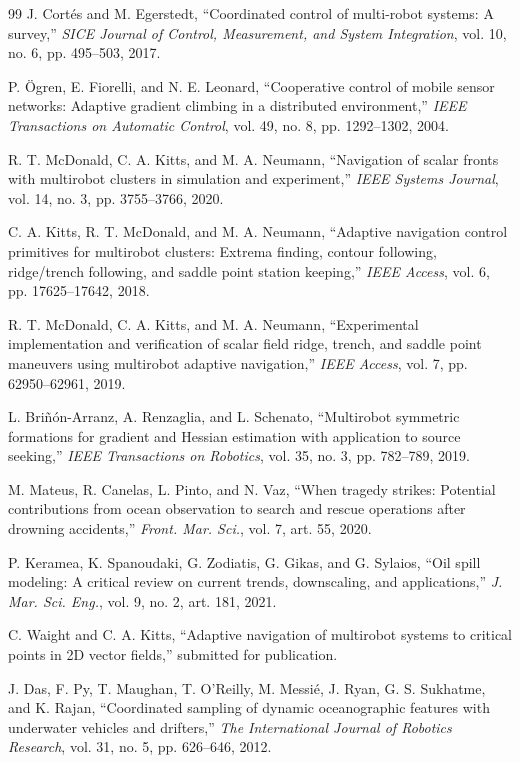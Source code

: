\documentclass[lettersize,journal]{IEEEtran}
\begin{document}
\begin{thebibliography}{99}
 J. Cortés and M. Egerstedt, ``Coordinated control of multi-robot
systems: A survey,'' \textit{SICE Journal of Control, Measurement, and
System Integration}, vol. 10, no. 6, pp. 495--503, 2017.

 P. Ögren, E. Fiorelli, and N. E. Leonard, ``Cooperative control
of mobile sensor networks: Adaptive gradient climbing in a distributed
environment,'' \textit{IEEE Transactions on Automatic Control}, vol. 49, no. 8,
pp. 1292--1302, 2004.

 R. T. McDonald, C. A. Kitts, and M. A. Neumann, ``Navigation of
scalar fronts with multirobot clusters in simulation and experiment,''
\textit{IEEE Systems Journal}, vol. 14, no. 3, pp. 3755--3766, 2020.

 C. A. Kitts, R. T. McDonald, and M. A. Neumann, ``Adaptive
navigation control primitives for multirobot clusters: Extrema finding,
contour following, ridge/trench following, and saddle point station keeping,''
\textit{IEEE Access}, vol. 6, pp. 17625--17642, 2018.

 R. T. McDonald, C. A. Kitts, and M. A. Neumann, ``Experimental
implementation and verification of scalar field ridge, trench, and saddle
point maneuvers using multirobot adaptive navigation,'' \textit{IEEE Access},
vol. 7, pp. 62950--62961, 2019.

 L. Briñón-Arranz, A. Renzaglia, and L. Schenato, ``Multirobot
symmetric formations for gradient and Hessian estimation with application to
source seeking,'' \textit{IEEE Transactions on Robotics}, vol. 35, no. 3,
pp. 782--789, 2019.

 M. Mateus, R. Canelas, L. Pinto, and N. Vaz, ``When
tragedy strikes: Potential contributions from ocean observation to
search and rescue operations after drowning accidents,'' \textit{Front.
Mar. Sci.}, vol. 7, art. 55, 2020.

 P. Keramea, K. Spanoudaki, G. Zodiatis, G. Gikas, and
G. Sylaios, ``Oil spill modeling: A critical review on current trends,
downscaling, and applications,'' \textit{J. Mar. Sci. Eng.}, vol. 9,
no. 2, art. 181, 2021.

 C. Waight and C. A. Kitts, ``Adaptive navigation of multirobot
systems to critical points in 2D vector fields,'' submitted for publication.

 J. Das, F. Py, T. Maughan, T. O'Reilly, M. Messié, J. Ryan,
G. S. Sukhatme, and K. Rajan, ``Coordinated sampling of dynamic oceanographic
features with underwater vehicles and drifters,'' \textit{The International
Journal of Robotics Research}, vol. 31, no. 5, pp. 626--646, 2012.


\end{thebibliography}
\end{document}

